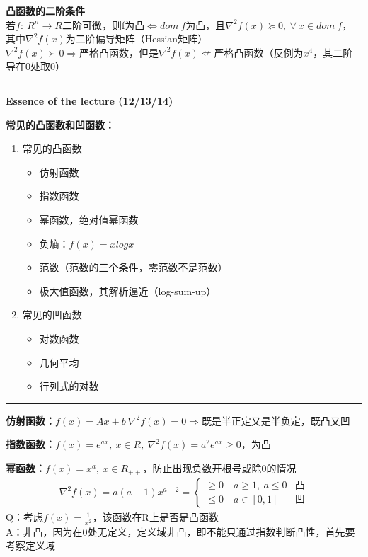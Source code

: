 \documentclass[11pt]{ctexart}         %
\begin{document}
\pagebreak
\textbf{凸函数的二阶条件}\\
若$f:\ R^n\to R$二阶可微，则f为凸$\Leftrightarrow dom\ f$为凸，且$\nabla^2f(x)\succeq 0,\ \forall\ x\in dom\ f$，\\其中$\nabla^2f(x)$为二阶偏导矩阵（Hessian矩阵）\\
$\nabla^2f(x)\succ 0\Rightarrow$严格凸函数，但是$\nabla^2f(x)\nLeftarrow$严格凸函数（反例为$x^4$，其二阶导在0处取0）

\newpage
\hrule height 4pt
\begin{Large}
	\textbf{Essence of the lecture (12/13/14)}\\
\end{Large}
\begin{large}
	\textbf{常见的凸函数和凹函数：} 
\end{large}
\vspace{-16pt}
\begin{enumerate} \setlength{\itemsep}{0pt}
	\item 常见的凸函数
		\begin{itemize} \setlength{\itemsep}{0pt}
			\item 仿射函数
			\item 指数函数
			\item 幂函数，绝对值幂函数
			\item 负熵：$f(x)=xlogx$
			\item 范数（范数的三个条件，零范数不是范数）
			\item 极大值函数，其解析逼近（log-sum-up）
		\end{itemize}
	\item 常见的凹函数
		\begin{itemize} \setlength{\itemsep}{0pt}
			\item 对数函数
			\item 几何平均
			\item 行列式的对数
		\end{itemize}
\end{enumerate}
\hrule height 4pt

\textbf{仿射函数：}$f(x)=Ax+b\ \nabla^2f(x)=0\Rightarrow$既是半正定又是半负定，既凸又凹

\textbf{指数函数：}$f(x)=e^{ax},\ x\in R,\ \nabla^2f(x)=a^2e^{ax}\geq 0$，为凸

\textbf{幂函数：}$f(x)=x^a,\ x\in R_{++}$，防止出现负数开根号或除0的情况
\begin{align*}
	\nabla^2f(x)=a(a-1)x^{a-2}=
	\begin{cases}
		\geq 0\quad a\geq 1,\ a\leq 0 &\text{凸}\\
		\leq 0\quad a\in[0,1] &\text{凹}
	\end{cases}
\end{align*}
Q：考虑$f(x)=\frac{1}{x^2}$，该函数在R上是否是凸函数\\
A：非凸，因为在0处无定义，定义域非凸，即不能只通过指数判断凸性，首先要考察定义域
\end{document}
